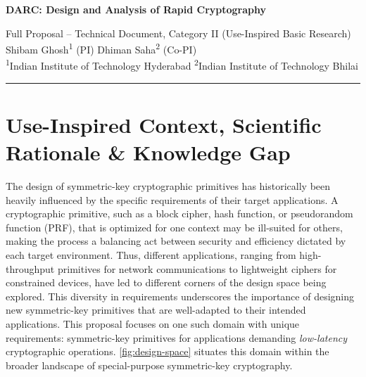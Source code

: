 
\renewcommand{\tx}{\textsf} %
\newcommand{\soptitle}{DARC: Design and Analysis of Rapid Cryptography}
\newcommand{\sopsubtitle}{Full Proposal -- Technical Document, Category II (Use-Inspired Basic Research)}

\begin{center}
\vspace*{-0.8cm}
{\sffamily\bfseries\Large \textcolor{theme}{\soptitle}}\par
\vspace{2pt}
{\sffamily\sopsubtitle}\\[4pt]
Shibam Ghosh\textsuperscript{1} (PI) \quad Dhiman Saha\textsuperscript{2} (Co-PI) \\[1ex]
\small \textsuperscript{1}Indian Institute of Technology Hyderabad
  \small \textsuperscript{2}Indian Institute of Technology Bhilai \\[1ex]
\vspace{8pt}
\hrule
\end{center}

\section{Use-Inspired Context, Scientific Rationale \& Knowledge Gap}

The design of symmetric-key cryptographic primitives has historically been heavily influenced by the specific requirements of their target applications.
A cryptographic primitive, such as a block cipher, hash function, or pseudorandom function (PRF), that is optimized for one context may be ill-suited for others, making the process a balancing act between security and efficiency dictated by each target environment.
Thus, different applications, ranging from high-throughput primitives for network communications to lightweight ciphers for constrained devices, have led to different corners of the design space being explored.
This diversity in requirements underscores the importance of designing new symmetric-key primitives that are well-adapted to their intended applications.
This proposal focuses on one such domain with unique requirements: symmetric-key primitives for applications demanding \emph{low-latency} cryptographic operations.
\cref{fig:design-space} situates this domain within the broader landscape of special-purpose symmetric-key cryptography.

